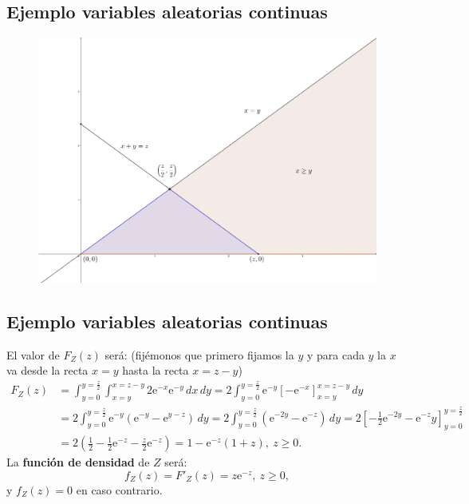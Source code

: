 \documentclass[]{book}
\begin{document}
\hypertarget{ejemplo-variables-aleatorias-continuas-1}{%
\subsection{Ejemplo variables aleatorias continuas}\label{ejemplo-variables-aleatorias-continuas-1}}

\begin{figure}
\includegraphics[width=750px]{Images/EjSumaXY} \end{figure}

\hypertarget{ejemplo-variables-aleatorias-continuas-2}{%
\subsection{Ejemplo variables aleatorias continuas}\label{ejemplo-variables-aleatorias-continuas-2}}

El valor de \(F_Z(z)\) será: (fijémonos que primero fijamos la \(y\) y para cada \(y\) la \(x\) va desde la recta \(x=y\) hasta la recta \(x=z-y\))
\[
\begin{array}{rl}
F_Z(z) & =\int_{y=0}^{y=\frac{z}{2}}\int_{x=y}^{x=z-y}2 \mathrm{e}^{-x}\mathrm{e}^{-y}\, dx\, dy = 2 \int_{y=0}^{y=\frac{z}{2}} \mathrm{e}^{-y} \left[-\mathrm{e}^{-x}\right]_{x=y}^{x=z-y}\, dy \\ & = 2 \int_{y=0}^{y=\frac{z}{2}} \mathrm{e}^{-y} \left(\mathrm{e}^{-y}-\mathrm{e}^{y-z}\right)\, dy = 2 \int_{y=0}^{y=\frac{z}{2}} \left(\mathrm{e}^{-2y}-\mathrm{e}^{-z} \right)\, dy  = 2\left[-\frac{1}{2}\mathrm{e}^{-2y}-\mathrm{e}^{-z} y\right]_{y=0}^{y=\frac{z}{2}} \\ & = 2\left(\frac{1}{2}-\frac{1}{2}\mathrm{e}^{-z}-\frac{z}{2}\mathrm{e}^{-z}\right) = 1-\mathrm{e}^{-z}(1+z),\ z\geq 0.
\end{array}
\]
La \textbf{función de densidad} de \(Z\) será:
\[
f_Z(z)=F'_Z(z)=z \mathrm{e}^{-z},\ z\geq 0,
\]
y \(f_Z(z)=0\) en caso contrario.
\end{document}
